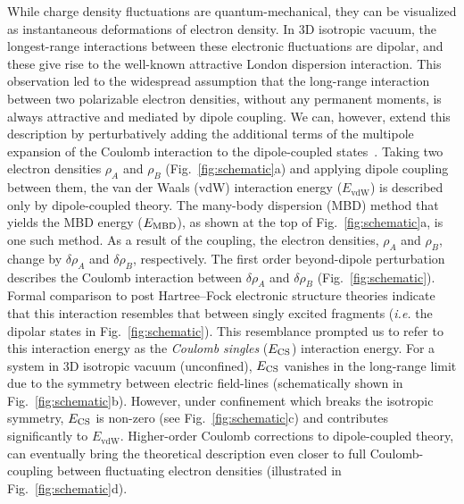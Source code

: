 \documentclass[aps,prl,groupaddress, twocolumn]{revtex4-1}  %
\begin{document}
While charge density fluctuations are quantum-mechanical, they can be visualized as instantaneous deformations of electron density. In 3D isotropic vacuum, the longest-range interactions between these electronic fluctuations are dipolar, and these give rise to the well-known attractive London dispersion interaction. This observation led to the widespread assumption that the long-range interaction between two polarizable electron densities, without any permanent moments, is always attractive and mediated by dipole coupling. We can, however, extend this description by perturbatively adding the additional terms of the multipole expansion of the Coulomb interaction to the dipole-coupled states~\cite{sadhukhan_prl_2017}. Taking two electron densities $\rho_A$ and $\rho_B$ (Fig.~\ref{fig:schematic}a) and applying dipole coupling between them, the van der Waals (vdW) interaction energy ($E_\text{vdW}$) is described only by dipole-coupled theory. The many-body dispersion (MBD) method that yields the MBD energy ($E_{\rm MBD}$), as shown at the top of Fig.~\ref{fig:schematic}a, is one such method. As a result of the coupling, the electron densities, $\rho_A$ and $\rho_B$, change by $\delta \rho_A$ and $\delta \rho_B$, respectively. The first order beyond-dipole perturbation describes the Coulomb interaction between $\delta \rho_A$ and $\delta \rho_B$ (Fig.~\ref{fig:schematic}). Formal comparison to post Hartree--Fock electronic structure theories indicate that this interaction resembles that between singly excited fragments (\textit{i.e.} the dipolar states in Fig.~\ref{fig:schematic}). This resemblance prompted us to refer to this interaction energy as the \textit{Coulomb singles} ($E_{\rm CS}$) interaction energy. For a system in 3D isotropic vacuum (unconfined), $E_{\rm CS}$ vanishes in the long-range limit due to the symmetry between electric field-lines (schematically shown in Fig.~\ref{fig:schematic}b). However, under confinement which breaks the isotropic symmetry, $E_{\rm CS}$ is non-zero (see Fig.~\ref{fig:schematic}c) and contributes significantly to $E_\text{vdW}$. %
Higher-order Coulomb corrections to dipole-coupled theory, can eventually bring the theoretical description even closer to full Coulomb-coupling between fluctuating electron densities (illustrated in Fig.~\ref{fig:schematic}d).
\end{document}
